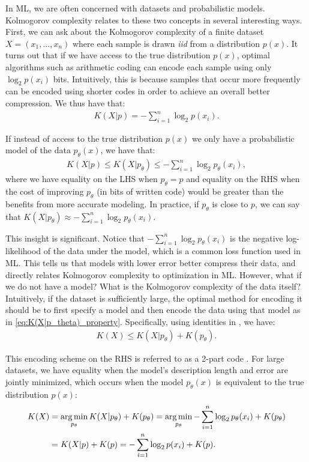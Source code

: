 \documentclass{article}
\begin{document}
\begin{appendices}
In ML, we are often concerned with datasets and probabilistic models. Kolmogorov complexity relates to these two concepts in several interesting ways. First, we can ask about the Kolmogorov complexity of a finite dataset $X = (x_1, ..., x_n)$ where each sample is drawn \textit{iid} from a distribution $p(x)$. It turns out that if we have access to the true distribution $p(x)$, optimal algorithms such as arithmetic coding \citep{witten1987arithmetic} can encode each sample using only $\log_2p(x_i)$ bits. Intuitively, this is because samples that occur more frequently can be encoded using shorter codes in order to achieve an overall better compression. We thus have that:
\begin{align}
\label{eq:K(X|p)_property}
K(X|p) = -\sum_{i=1}^n \log_2p(x_i) .
\end{align}

If instead of access to the true distribution $p(x)$ we only have a probabilistic model of the data $p_\theta(x)$, we have that:
\begin{align}
\label{eq:K(X|p_theta)_property}
K(X|p) \leq K(X|p_\theta) \leq -\sum_{i=1}^n \log_2p_\theta(x_i) ,
\end{align}
where we have equality on the LHS when $p_\theta = p$ and equality on the RHS when the cost of improving $p_\theta$ (in bits of written code) would be greater than the benefits from more accurate modeling. In practice, if $p_\theta$ is close to $p$, we can say that $K(X|p_\theta) \approx -\sum_{i=1}^n \log_2p_\theta(x_i)$.

This insight is significant. Notice that $-\sum_{i=1}^n \log_2p_\theta(x_i)$ is the negative log-likelihood of the data under the model, which is a common loss function used in ML. This tells us that models with lower error better compress their data, and directly relates Kolmogorov complexity to optimization in ML. However, what if we do not have a model? What is the Kolmogorov complexity of the data itself? Intuitively, if the dataset is sufficiently large, the optimal method for encoding it should be to first specify a model and then encode the data using that model as in \cref{eq:K(X|p_theta)_property}. Specifically, using identities in \citet{fortnow2000kolmogorov}, we have:
\begin{align}
\label{eq:K(X)_property}
K(X) \leq K(X|p_\theta) + K(p_\theta) .
\end{align}

This encoding scheme on the RHS is referred to as a 2-part code \citep{grunwald2007minimum}. For large datasets, we have equality when the model's description length and error are jointly minimized, which occurs when the model $p_\theta(x)$ is equivalent to the true distribution $p(x)$:
\begin{align}
\label{eq:K(X)_argmin_property_1}
K(X) &= \operatorname*{arg\,min}_{p_\theta} K(X|p_\theta) + K(p_\theta) =  \operatorname*{arg\,min}_{p_\theta} -\sum_{i=1}^n \log_2p_\theta(x_i) + K(p_\theta) \\
\label{eq:K(X)_argmin_property_2}
     &= K(X|p) + K(p) = -\sum_{i=1}^n \log_2p(x_i) + K(p) .
\end{align}


\end{appendices}
\end{document}
